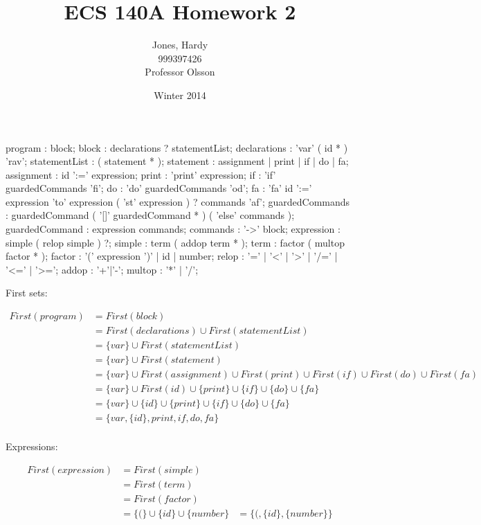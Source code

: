 \documentclass[12pt,letterpaper]{article}
\title{ECS 140A Homework 2\vspace{-2ex}}
\author{Jones, Hardy\\
        999397426\\
        Professor Olsson\vspace{-2ex}}
\date{Winter 2014}
\begin{document}
  \maketitle

  \begin{rail}
    program : block;
    block : declarations ? statementList;
    declarations : 'var' ( id * ) 'rav';
    statementList : ( statement * );
    statement : assignment | print | if | do | fa;
    assignment : id ':=' expression;
    print : 'print' expression;
    if : 'if' guardedCommands 'fi';
    do : 'do' guardedCommands 'od';
    fa : 'fa' id ':=' expression 'to' expression ( 'st' expression ) ? commands 'af';
    guardedCommands : guardedCommand ( '[]' guardedCommand * ) ( 'else' commands );
    guardedCommand : expression commands;
    commands : '->' block;
    expression : simple ( relop simple ) ?;
    simple : term ( addop term * );
    term : factor ( multop factor * );
    factor : '(' expression ')' | id | number;
    relop : '=' | '<' | '>' | '/=' | '<=' | '>=';
    addop : '+'|'-';
    multop : '*' | '/';
  \end{rail}


  First sets:

  \begin{align*}
    First(program) &= First(block) \\
    &= First(declarations) \cup First(statementList) \\
    &= \{ var \} \cup First(statementList) \\
    &= \{ var \} \cup First(statement) \\
    &= \{ var \} \cup First(assignment) \cup First(print) \cup First(if) \cup First(do) \cup First(fa)\\
    &= \{ var \} \cup First(id) \cup \{ print \} \cup \{ if \} \cup \{ do \} \cup \{ fa \}\\
    &= \{ var \} \cup \{ id \} \cup \{ print \} \cup \{ if \} \cup \{ do \} \cup \{ fa \}\\
    &= \{ var, \{ id \}, print, if, do, fa \}\\
  \end{align*}

  Expressions:

  \begin{align*}
    First(expression) &= First(simple) \\
    &= First(term) \\
    &= First(factor) \\
    &= \{ ( \} \cup \{ id \} \cup \{ number \}
    &= \{ (, \{ id \}, \{ number \} \}
  \end{align*}
\end{document}
